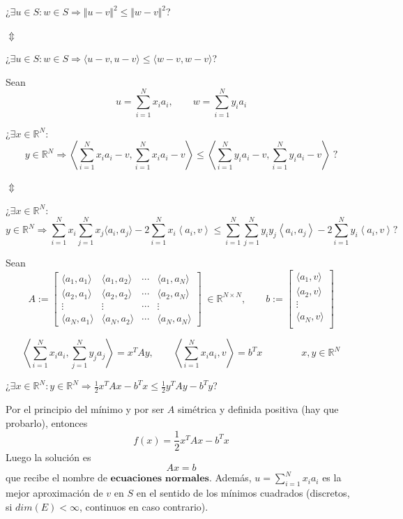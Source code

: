 ¿$\exists u \in S : w \in S \Rightarrow \Vert u-v \Vert ^2 \leq \Vert w-v \Vert ^2$?

$\Updownarrow$

¿$\exists u \in S : w \in S \Rightarrow \langle u-v, u-v \rangle \leq \langle w-v, w-v \rangle$?

Sean 
\[ u = \sum_{i=1}^N x_ia_i, \qquad w = \sum_{i=1}^N y_ia_i \]

¿$\exists x \in \mathbb{R}^N :$
\[ y \in \mathbb{R}^N \Rightarrow \left\langle \sum_{i=1}^N x_ia_i -v, \sum_{i=1}^N x_ia_i -v \right\rangle \leq \left\langle \sum_{i=1}^N y_ia_i -v, \sum_{i=1}^N y_ia_i -v \right\rangle \; ?\]


$\Updownarrow$

¿$\exists x \in \mathbb{R}^N :$
\[ y \in \mathbb{R}^N \Rightarrow \sum_{i=1}^N x_i \sum_{j=1}^N x_j \langle a_i, a_j \rangle -2 \sum_{i=1}^N x_i \left\langle a_i,v \right\rangle \leq \sum_{i=1}^N \sum_{j=1}^N y_iy_j \left\langle a_i, a_j \right\rangle - 2\sum_{i=1}^N y_i \left\langle a_i, v \right\rangle ?\]

Sean
\[ A := \begin{bmatrix}
\langle a_1,a_1 \rangle & \langle a_1,a_2 \rangle & \cdots & \langle a_1,a_N \rangle \\
\langle a_2,a_1 \rangle & \langle a_2,a_2 \rangle & \cdots & \langle a_2,a_N \rangle \\
\vdots & \vdots & \cdots & \vdots \\
\langle a_N,a_1 \rangle & \langle a_N,a_2 \rangle & \cdots & \langle a_N,a_N \rangle
\end{bmatrix}
\; \in \mathbb{R}^{N \times N}, \qquad
b := \begin{bmatrix}
\langle a_1,v \rangle \\
\langle a_2,v \rangle \\
\vdots \\
\langle a_N,v \rangle \\
\end{bmatrix}
\]

\[ \left\langle \sum_{i=1}^N x_ia_i, \sum_{j=1}^N y_ja_j \right\rangle = x^TAy, \qquad \left\langle \sum_{i=1}^N x_ia_i, v \right\rangle = b^Tx \qquad \qquad x,y \in \mathbb{R}^N\]

¿$\exists x \in \mathbb{R}^N : y \in \mathbb{R}^N \Rightarrow \frac{1}{2}x^TAx -b^Tx \leq \frac{1}{2} y^TAy - b^T y$? 

Por el principio del mínimo y por ser $A$ simétrica y definida positiva (hay que probarlo), entonces
\[ f(x) = \frac{1}{2} x^TAx - b^Tx \]
Luego la solución es
\[ Ax = b \]
que recibe el nombre de $\textbf{ecuaciones normales}$. Además, $u = \sum_{i=1}^N x_ia_i$ es la mejor aproximación de $v$ en $S$ en el sentido de los mínimos cuadrados (discretos, si $dim(E) < \infty$, continuos en caso contrario).

